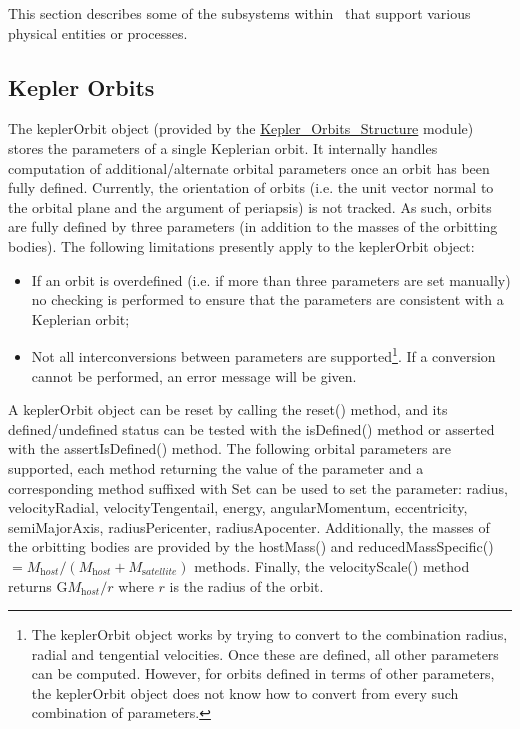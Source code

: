 This section describes some of the subsystems within \glc\ that support various physical entities or processes.

\subsection{Kepler Orbits}\label{sec:KeplerOrbits}

The {\normalfont \ttfamily keplerOrbit} object (provided by the \href{objects.kepler_orbits.F90:kepler_orbits_structure}{{\normalfont \ttfamily Kepler\_Orbits\_Structure}} module) stores the parameters of a single Keplerian orbit. It internally handles computation of additional/alternate orbital parameters once an orbit has been fully defined. Currently, the orientation of orbits (i.e. the unit vector normal to the orbital plane and the argument of periapsis) is not tracked. As such, orbits are fully defined by three parameters (in addition to the masses of the orbitting bodies). The following limitations presently apply to the {\normalfont \ttfamily keplerOrbit} object:
\begin{itemize}
 \item If an orbit is overdefined (i.e. if more than three parameters are set manually) no checking is performed to ensure that the parameters are consistent with a Keplerian orbit;
 \item Not all interconversions between parameters are supported\footnote{The {\normalfont \ttfamily keplerOrbit} object works by trying to convert to the combination radius, radial and tengential velocities. Once these are defined, all other parameters can be computed. However, for orbits defined in terms of other parameters, the {\normalfont \ttfamily keplerOrbit} object does not know how to convert from every such combination of parameters.}. If a conversion cannot be performed, an error message will be given. 
\end{itemize}
A {\normalfont \ttfamily keplerOrbit} object can be reset by calling the {\normalfont \ttfamily reset()} method, and its defined/undefined status can be tested with the {\normalfont \ttfamily isDefined()} method or asserted with the {\normalfont \ttfamily assertIsDefined()} method. The following orbital parameters are supported, each method returning the value of the parameter and a corresponding method suffixed with {\normalfont \ttfamily Set} can be used to set the parameter: {\normalfont \ttfamily radius}, {\normalfont \ttfamily velocityRadial}, {\normalfont \ttfamily velocityTengentail}, {\normalfont \ttfamily energy}, {\normalfont \ttfamily angularMomentum}, {\normalfont \ttfamily eccentricity}, {\normalfont \ttfamily semiMajorAxis}, {\normalfont \ttfamily radiusPericenter}, {\normalfont \ttfamily radiusApocenter}. Additionally, the masses of the orbitting bodies are provided by the {\normalfont \ttfamily hostMass()} and {\normalfont \ttfamily reducedMassSpecific()}$=M_{\mathrm host}/(M_{\mathrm host}+M_{\mathrm satellite})$ methods. Finally, the {\normalfont \ttfamily velocityScale()} method returns ${\mathrm G}M_{\mathrm host}/r$ where $r$ is the radius of the orbit.

